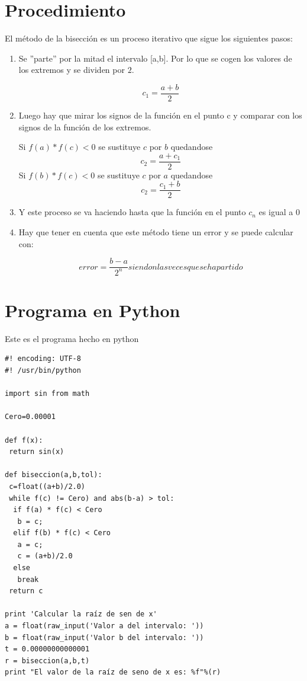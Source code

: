 


\section{Procedimiento}
\label{3:sec:1}
El método de la bisección es un proceso iterativo que sigue los siguientes pasos:
\begin{enumerate}
 \item
  Se ''parte'' por la mitad el intervalo [a,b]. Por lo que se cogen los valores de los extremos y se dividen por $2$.
  \begin{center}
   $$ c_1=\frac{a+b}{2} $$
  \end{center}
 \item
  Luego hay que mirar los signos de la función en el punto c y comparar con los signos de la función de los extremos.
   \begin{enumerate}
    \Item
     Si $f(a)*f(c)<0$ se sustituye $c$ por $b$ quedandose $$c_2=\frac{a+c_1}{2}$$
    \Item
     Si $f(b)*f(c)<0$ se sustituye $c$ por $a$ quedandose $$c_2=\frac{c_1+b}{2}$$
   \end{enumerate}
 \item
  Y este proceso se va haciendo hasta que la función en el punto $c_n$ es igual a $0$
 \item
  Hay que tener en cuenta que este método tiene un error y se puede calcular con:
  \begin{center}
   $$ error=\frac{b-a}{2^n} siendo n las veces que se ha partido$$
  \end{center}
\end{enumerate}

\section{Programa en Python}
\label{3:sec:2}
Este es el programa hecho en python
\begin{verbatim}
#! encoding: UTF-8
#! /usr/bin/python 

import sin from math

Cero=0.00001

def f(x):
 return sin(x)

def biseccion(a,b,tol):
 c=float((a+b)/2.0)
 while f(c) != Cero) and abs(b-a) > tol:
  if f(a) * f(c) < Cero
   b = c;
  elif f(b) * f(c) < Cero
   a = c;
   c = (a+b)/2.0
  else
   break
 return c

print 'Calcular la raíz de sen de x'
a = float(raw_input('Valor a del intervalo: '))
b = float(raw_input('Valor b del intervalo: '))
t = 0.00000000000001
r = biseccion(a,b,t)
print "El valor de la raíz de seno de x es: %f"%(r)
\end{verbatim}

